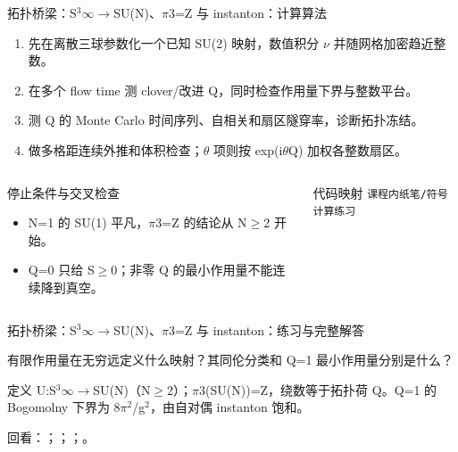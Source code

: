 \begin{frame}[t]{拓扑桥梁：S\ensuremath{^{3}}\ensuremath{\infty}\ensuremath{\rightarrow}SU(N)、\ensuremath{\pi}3=Z 与 instanton：计算算法}
\footnotesize
{}\begin{enumerate}
\item 先在离散三球参数化一个已知 SU(2) 映射，数值积分 \ensuremath{\nu} 并随网格加密趋近整数。
\item 在多个 flow time 测 clover/\allowbreak{}改进 Q，同时检查作用量下界与整数平台。
\item 测 Q 的 Monte Carlo 时间序列、自相关和扇区隧穿率，诊断拓扑冻结。
\item 做多格距连续外推和体积检查；\ensuremath{\theta} 项则按 exp(i\ensuremath{\theta}Q) 加权各整数扇区。
\end{enumerate}\begin{columns}[T,onlytextwidth]
\begin{block}{停止条件与交叉检查}\scriptsize\begin{itemize}
\item[\CheckMark] N=1 的 SU(1) 平凡，\ensuremath{\pi}3=Z 的结论从 N\ensuremath{\ge}2 开始。
\item[\CheckMark] Q=0 只给 S\ensuremath{\ge}0；非零 Q 的最小作用量不能连续降到真空。
\end{itemize}\end{block}
\begin{block}{代码映射}
\scriptsize \texttt{课程内纸笔/\allowbreak{}符号计算练习}
\end{block}\end{columns}\end{frame}

\begin{frame}[t]{拓扑桥梁：S\ensuremath{^{3}}\ensuremath{\infty}\ensuremath{\rightarrow}SU(N)、\ensuremath{\pi}3=Z 与 instanton：练习与完整解答}
\footnotesize
\begin{block}{}有限作用量在无穷远定义什么映射？其同伦分类和 Q=1 最小作用量分别是什么？\end{block}
\begin{exampleblock}{}定义 U:S\ensuremath{^{3}}\ensuremath{\infty}\ensuremath{\rightarrow}SU(N)（N\ensuremath{\ge}2）；\ensuremath{\pi}3(SU(N))=Z，绕数等于拓扑荷 Q。Q=1 的 Bogomolny 下界为 8\ensuremath{\pi}\ensuremath{^{2}}/\allowbreak{}g\ensuremath{^{2}}，由自对偶 instanton 饱和。\end{exampleblock}
\vfill
\scriptsize 回看：；；；。
\end{frame}

